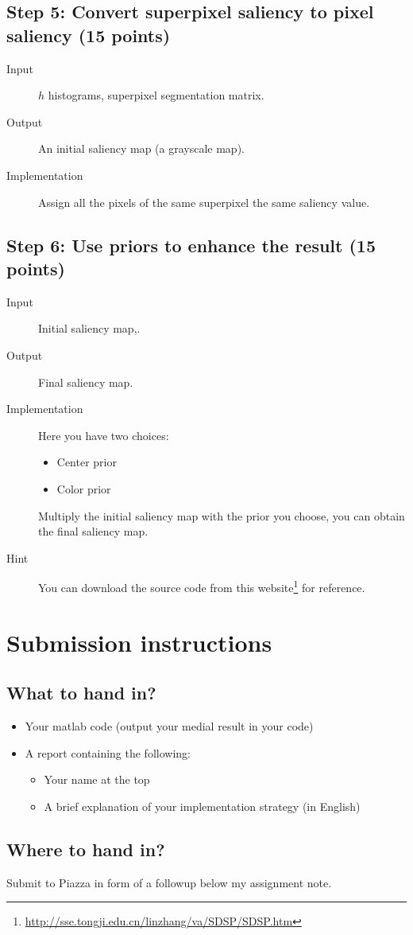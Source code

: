 \documentclass[12pt]{article}
\begin{document}
\subsection{Step 5: Convert superpixel saliency to pixel saliency (15 points)}

\begin{description}
\item[Input] $h$ histograms, superpixel segmentation matrix.
\item[Output] An initial saliency map (a grayscale map).
\item[Implementation] Assign all the pixels of the same superpixel the same saliency value. 
\end{description}

\subsection{Step 6: Use priors to enhance the result (15 points)}

\begin{description}
\item[Input] Initial saliency map,.
\item[Output] Final saliency map.
\item[Implementation] Here you have two choices:
\begin{itemize}
\item Center prior
\item Color prior
\end{itemize}
Multiply the initial saliency map with the prior you choose, you can obtain the final saliency map.
\item[Hint] You can download the source code from this website\footnote{\url{http://sse.tongji.edu.cn/linzhang/va/SDSP/SDSP.htm}} for reference.
\end{description}

\section{Submission instructions}

\subsection{What to hand in?}

\begin{itemize}
\item Your matlab code (output your medial result in your code)
\item A report containing the following:
\begin{itemize}
\item Your name at the top
\item A brief explanation of your implementation strategy (in English)
\end{itemize}
\end{itemize}

\subsection{Where to hand in?}

Submit to Piazza in form of a followup below my assignment note.





%
%
% 

\end{document}
